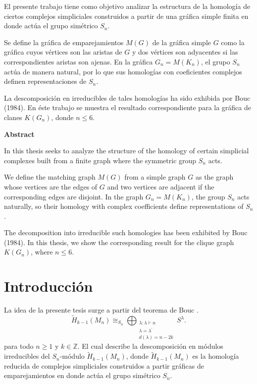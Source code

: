 \documentclass[12pt]{book}
\theoremstyle{definition}
\newcounter{in}
\newcounter{ini}
\begin{document}
El presente trabajo tiene como objetivo analizar la estructura de
la homología de ciertos complejos simpliciales construidos a partir de una
gráfica simple finita en donde actúa el grupo simétrico $S_{n}$.

Se define la gráfica de emparejamientos $M(G)$ de la gráfica simple
$G$ como la gráfica cuyos vértices son las aristas de $G$ y dos
vértices son adyacentes si las correspondientes aristas son ajenas. En
la gráfica $G_{n}=M(K_{n})$, el grupo $S_{n}$ actúa de manera natural, por
lo que sus homologías con coeficientes complejos definen
representaciones de $S_{n}$. 

La descomposición en irreducibles de tales homologías ha sido exhibida
por Bouc (1984). En éste trabajo se muestra el resultado correspondiente para la
gráfica de clanes $K(G_{n})$, donde $n\leq 6$.

\vspace{2cm}

\begin{flushleft}
  {\bfseries\Large Abstract}
\end{flushleft}

In this thesis seeks to analyze the structure of the homology of
certain simplicial complexes built from a finite graph where the
symmetric group $S_{n}$ acts. 

We define the matching graph $M(G)$ from a simple graph $G$ as 
the graph whose vertices are the edges of $G$ and two vertices are
adjacent if the corresponding edges are disjoint. In the graph
$G_{n}=M(K_{n})$, the group $S_{n}$ acts naturally, so their homology
with complex coefficients define representations of $S_{n}$. 

The decomposition into irreducible such homologies has been exhibited 
by Bouc (1984). In this thesis, we show the corresponding result for
the clique graph $K(G_{n})$, where $n\leq 6$.

\chapter*{Introducción}

La idea de la presente tesis surge a partir del teorema de Bouc
\cite{MR756517}. 
\begin{equation*}
  \widetilde H_{k-1}(M_{n})\cong_{S_{n}}\bigoplus_{\substack{\lambda:\lambda\vdash n\\
      \lambda=\lambda^{'}\\d(\lambda)=n-2k}} S^{\lambda}.
\end{equation*}
para todo $n\geq1$ y $k\in \mathbb{Z}$. El cual describe la descomposición en módulos irreducibles del
$S_{n}$-módulo $\widetilde H_{k-1}(M_{n})$, donde $\widetilde
H_{k-1}(M_{n})$ es la homología reducida de complejos simpliciales
construidos a partir gráficas de emparejamientos en donde actúa el
grupo simétrico $S_{n}$.
\end{document}

